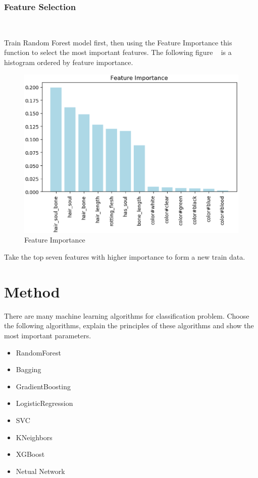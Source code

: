 \subsubsection{Feature Selection}
\

Train Random Forest model first, 
then using the Feature Importance this function 
to select the most important features. 
The following figure ~
is a histogram ordered by feature importance. 


\begin{figure}[htbp]
	\centering
	\includegraphics[scale=0.3]{figures/FEATURE.eps}
	\caption{Feature Importance}\label{fig:feature_importance}
\end{figure}

Take the top seven features 
with higher importance 
to form a new train data.


\section{Method}

There are many machine learning algorithms 
for classification problem. 
Choose the following algorithms, 
explain the principles of
these algorithms and 
show the most important parameters.

\begin{itemize}
	\item RandomForest 
	\item Bagging
	\item GradientBoosting
	\item LogisticRegression
	\item SVC
	\item KNeighbors 
	\item XGBoost
	\item Netual Network
\end{itemize}

